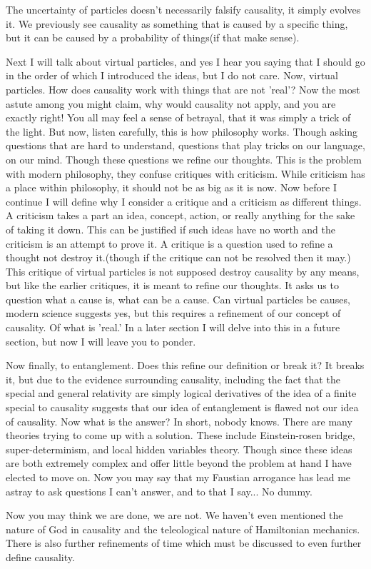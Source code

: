 \par The uncertainty of particles doesn't necessarily falsify causality, it simply evolves it. We previously see causality as something that is caused by a specific thing, but it can be caused by a probability of things(if that make sense).

\par Next I will talk about virtual particles, and yes I hear you saying that I should go in the order of which I introduced the ideas, but I do not care. Now, virtual particles. How does causality work with things that are not 'real'? Now the most astute among you might claim, why would causality not apply, and you are exactly right! You all may feel a sense of betrayal,  that it was simply a trick of the light. But now, listen carefully, this is how philosophy works. Though asking questions that are hard to understand, questions that play tricks on our language, on our mind. Though these questions we refine our thoughts. This is the problem with modern philosophy, they confuse critiques with criticism. While criticism has a place within philosophy, it should not be as big as it is now. Now before I continue I will define why I consider a critique and a criticism as different things. A criticism takes a part an idea, concept, action, or really anything for the sake of taking it down. This can be justified if such ideas have no worth and the criticism is an attempt to prove it. A critique is a question used to refine a thought not destroy it.(though if the critique can not be resolved then it may.) This critique of virtual particles is not supposed destroy causality by any means, but like the earlier critiques, it is meant to refine our thoughts. It asks us to question what a cause is, what can be a cause. Can virtual particles be causes, modern science suggests yes, but this requires a refinement of our concept of causality. Of what is 'real.' In a later section I will delve into this in a future section, but now I will leave you to ponder.
\par Now finally, to entanglement. Does this refine our definition or break it? It breaks it, but due to the evidence surrounding causality, including the fact that the special and general relativity are simply logical derivatives of the idea of a finite special to causality suggests that our idea of entanglement is flawed not our idea of causality. Now what is the answer? In short, nobody knows. There are many theories trying to come up with a solution. These include Einstein-rosen bridge, super-determinism, and local hidden variables theory. Though since these ideas are both extremely complex and offer little beyond the problem at hand I have elected to move on. Now you may say that my Faustian arrogance has lead me astray to ask questions I can't answer, and to that I say... No dummy.
\par Now you may think we are done, we are not. We haven't even mentioned the nature of God in causality and the teleological nature of Hamiltonian mechanics. There is also further refinements of time which must be discussed to even further define causality.
